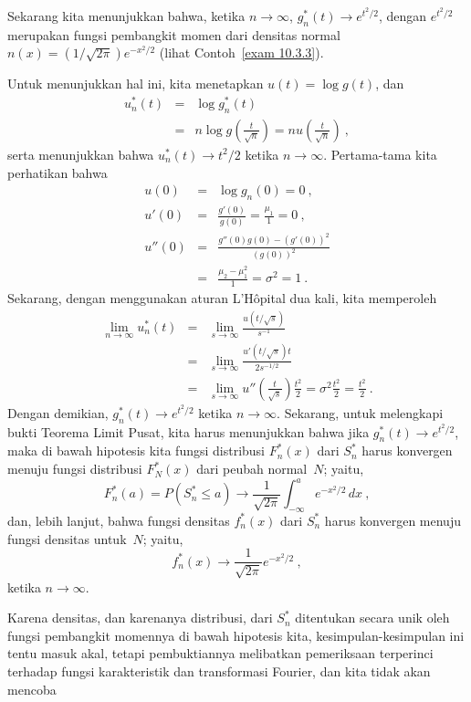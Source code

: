 Sekarang kita menunjukkan bahwa, ketika $n \to \infty$, $g_n^*(t) \to e^{t^2/2}$, dengan
$e^{t^2/2}$ merupakan fungsi pembangkit momen dari densitas normal $n(x) =
(1/\sqrt{2\pi}) e^{-x^2/2}$ (lihat Contoh~\ref{exam 10.3.3}).

Untuk menunjukkan hal ini, kita menetapkan $u(t) = \log g(t)$, dan
\begin{eqnarray*}
u_n^*(t) &=& \log g_n^*(t) \\
         &=& n\log g\left(\frac t{\sqrt n}\right) = nu\left(\frac t{\sqrt n}\right)\ ,
\end{eqnarray*}
serta menunjukkan bahwa $u_n^*(t) \to t^2/2$ ketika $n \to \infty$.  Pertama-tama kita perhatikan bahwa
\begin{eqnarray*} 
  u(0) &=& \log g_n(0) = 0\ , \\
 u'(0) &=& \frac{g'(0)}{g(0)} = \frac{\mu_1}1 = 0\ , \\
u''(0) &=& \frac{g''(0)g(0) - (g'(0))^2}{(g(0))^2} \\
       &=& \frac{\mu_2 - \mu_1^2}1 = \sigma^2 = 1\ .
\end{eqnarray*}
Sekarang, dengan menggunakan aturan L'H\^opital dua kali, kita memperoleh
\begin{eqnarray*}
\lim_{n \to \infty} u_n^*(t) &=& \lim_{s \to \infty} \frac{u(t/\sqrt s)}{s^{-1}}\\
     &=& \lim_{s \to \infty} \frac{u'(t/\sqrt s) t}{2s^{-1/2}} \\
     &=& \lim_{s \to \infty} u''\left(\frac t{\sqrt s}\right) \frac{t^2}2 = \sigma^2
\frac{t^2}2 = \frac{t^2}2\ .
\end{eqnarray*}
Dengan demikian, $g_n^*(t) \to e^{t^2/2}$ ketika $n \to \infty$.  Sekarang, untuk melengkapi bukti
Teorema Limit Pusat, kita harus menunjukkan bahwa jika $g_n^*(t) \to e^{t^2/2}$,
maka di bawah hipotesis kita fungsi distribusi $F_n^*(x)$ dari $S_n^*$
harus konvergen menuju fungsi distribusi $F_N^*(x)$ dari peubah
normal~$N$; yaitu,
$$
F_n^*(a) = P(S_n^* \leq a) \to \frac1{\sqrt{2\pi}} \int_{-\infty}^a
e^{-x^2/2}\, dx\ ,
$$
dan, lebih lanjut, bahwa fungsi densitas $f_n^*(x)$ dari $S_n^*$ harus
konvergen menuju fungsi densitas untuk~$N$; yaitu,
$$
f_n^*(x) \to \frac1{\sqrt{2\pi}} e^{-x^2/2}\ ,
$$
ketika $n \rightarrow \infty$.
\par
Karena densitas, dan karenanya distribusi, dari $S_n^*$ ditentukan secara unik 
oleh fungsi pembangkit momennya di bawah hipotesis kita, kesimpulan-kesimpulan ini
tentu masuk akal, tetapi pembuktiannya melibatkan pemeriksaan terperinci terhadap
fungsi karakteristik dan transformasi Fourier, dan kita tidak akan mencoba
